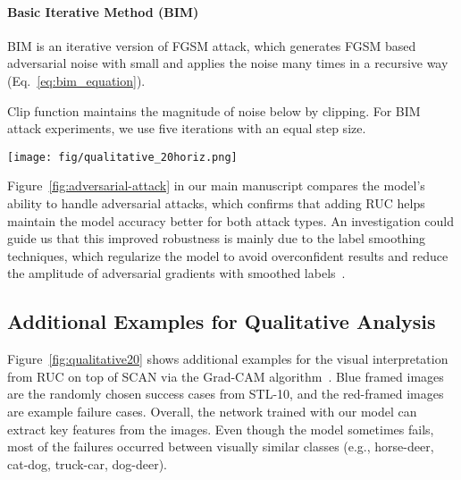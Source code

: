 \documentclass[final]{cvpr}
\newcommand{\model}{\textsf{RUC}}
\begin{document}
\paragraph{Basic Iterative Method (BIM)}
BIM is an iterative version of FGSM attack, which generates FGSM based adversarial noise with small  and applies the noise many times in a recursive way (Eq.~\eqref{eq:bim_equation}).

Clip function maintains the magnitude of noise below  by clipping. For BIM attack experiments, we use five iterations with an equal step size. \smallskip

\begin{figure*}[t!]
\centering
\texttt{[image: fig/qualitative\_20horiz.png]}
\caption{Additional example of successes and failures from STL-10 where the highlighted part indicates how the model interprets class traits based on the Grad-CAM method (Blue frame: success case, Red frame: failure case).}
\label{fig:qualitative20}
\end{figure*}
Figure~\ref{fig:adversarial-attack} in our main manuscript compares the model's ability to handle adversarial attacks, which confirms that adding \model{} helps maintain the model accuracy better for both attack types. An investigation could guide us that this improved robustness is mainly due to the label smoothing techniques, which regularize the model to avoid overconfident results and reduce the amplitude of adversarial gradients with smoothed labels~\cite{papernot2016distillation,warde201611}.






\subsection{Additional Examples for Qualitative Analysis}
Figure~\textcolor{red}{\ref{fig:qualitative20}} shows additional examples for the visual interpretation from RUC on top of SCAN via the Grad-CAM algorithm~\cite{selvaraju2017grad}. Blue framed images are the randomly chosen success cases from STL-10, and the red-framed images are example failure cases. Overall, the network trained with our model can extract key features from the images. Even though the model sometimes fails, most of the failures occurred between visually similar classes (e.g., horse-deer, cat-dog, truck-car, dog-deer).



 
\end{document}
